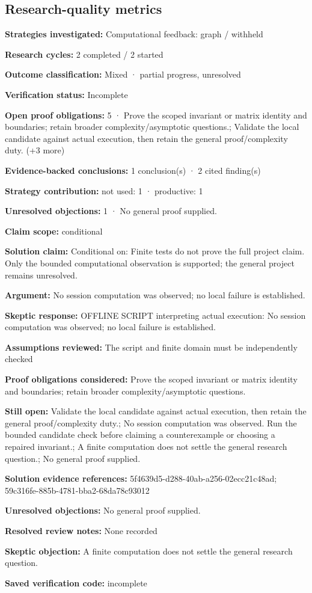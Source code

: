 \documentclass[11pt]{article}
\begin{document}
\subsection{Research-quality metrics}
\textbf{Strategies investigated:} Computational feedback: graph / withheld\par
\textbf{Research cycles:} 2 completed / 2 started\par
\textbf{Outcome classification:} Mixed · partial progress, unresolved\par
\textbf{Verification status:} Incomplete\par
\textbf{Open proof obligations:} 5 · Prove the scoped invariant or matrix identity and boundaries; retain broader complexity/asymptotic questions.; Validate the local candidate against actual execution, then retain the general proof/complexity duty. (+3 more)\par
\textbf{Evidence-backed conclusions:} 1 conclusion(s) · 2 cited finding(s)\par
\textbf{Strategy contribution:} not used: 1 · productive: 1\par
\textbf{Unresolved objections:} 1 · No general proof supplied.\par
\textbf{Claim scope:} conditional\par
\textbf{Solution claim:} Conditional on: Finite tests do not prove the full project claim. Only the bounded computational observation is supported; the general project remains unresolved.\par
\textbf{Argument:} No session computation was observed; no local failure is established.\par
\textbf{Skeptic response:} OFFLINE SCRIPT interpreting actual execution: No session computation was observed; no local failure is established.\par
\textbf{Assumptions reviewed:} The script and finite domain must be independently checked\par
\textbf{Proof obligations considered:} Prove the scoped invariant or matrix identity and boundaries; retain broader complexity/asymptotic questions.\par
\textbf{Still open:} Validate the local candidate against actual execution, then retain the general proof/complexity duty.; No session computation was observed. Run the bounded candidate check before claiming a counterexample or choosing a repaired invariant.; A finite computation does not settle the general research question.; No general proof supplied.\par
\textbf{Solution evidence references:} 5f4639d5-d288-40ab-a256-02ecc21c48ad; 59c316fe-885b-4781-bba2-68da78c93012\par
\textbf{Unresolved objections:} No general proof supplied.\par
\textbf{Resolved review notes:} None recorded\par
\textbf{Skeptic objection:} A finite computation does not settle the general research question.\par
\textbf{Saved verification code:} incomplete\par
\end{document}
